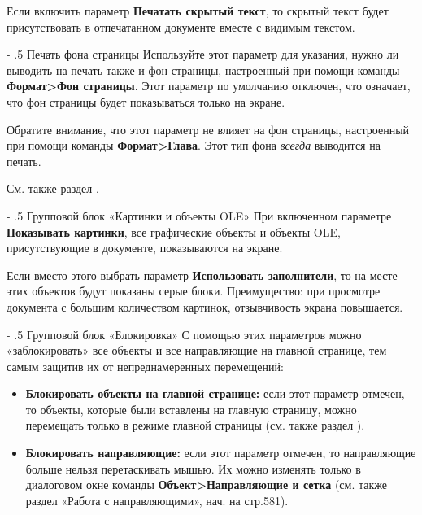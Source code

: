 ﻿\documentclass[a4paper,10pt]{article}
\makeatletter
\renewcommand\paragraph{%
   \@startsection{paragraph}{4}{0mm}%
      {-\baselineskip}%
      {.5\baselineskip}%
      {\normalfont\normalsize\bfseries}}
\makeatother
\begin{document}
 Если включить параметр \textbf{Печатать скрытый текст}, то скрытый текст будет присутствовать в отпечатанном документе вместе с видимым текстом.
 
 \paragraph{Печать фона страницы}
 Используйте этот параметр для указания, нужно ли выводить на печать также и фон страницы, настроенный при помощи команды \textbf{Формат>Фон страницы}. Этот параметр по умолчанию отключен, что означает, что фон страницы будет показываться только на экране.
 
 Обратите внимание, что этот параметр не влияет на фон страницы, настроенный при помощи команды \textbf{Формат>Глава}. Этот тип фона \textit{всегда} выводится на печать.
 
 См. также раздел .
 
 \paragraph{Групповой блок «Картинки и объекты OLE»}
 При включенном параметре \textbf{Показывать картинки}, все графические объекты и объекты OLE, присутствующие в документе, показываются на экране.
 
 Если вместо этого выбрать параметр \textbf{Использовать заполнители}, то на месте этих объектов будут показаны серые блоки. Преимущество: при просмотре документа с большим количеством картинок, отзывчивость экрана повышается.
 
 \paragraph{Групповой блок «Блокировка»}
 С помощью этих параметров можно «заблокировать» все объекты и все направляющие на главной странице, тем самым защитив их от непреднамеренных перемещений:
 
 \begin{itemize}
  \item \textbf{Блокировать объекты на главной странице:} если этот параметр отмечен, то объекты, которые были вставлены на главную страницу, можно перемещать только в режиме главной страницы (см. также раздел ).
  \item \textbf{Блокировать направляющие:} если этот параметр отмечен, то направляющие больше нельзя перетаскивать мышью. Их можно изменять только в диалоговом окне команды \textbf{Объект>Направляющие и сетка} (см. также раздел «Работа с направляющими», нач. на стр.581).
 \end{itemize}
\end{document}
